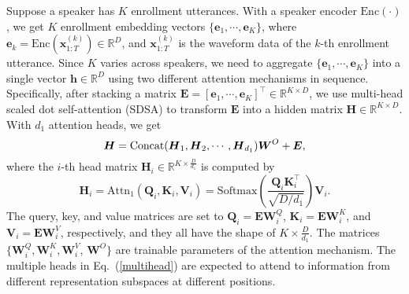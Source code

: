 \documentclass{article}
\begin{document}
Suppose a speaker has $K$ enrollment utterances. With a speaker encoder $\text{Enc}(\cdot)$,  we get $K$ enrollment embedding vectors $\{\boldsymbol{e}_1, \cdots, \boldsymbol{e}_K\}$, where $\boldsymbol{e}_k=\text{Enc}(\boldsymbol{x}_{1:T}^{(k)})\in\mathbb{R}^{D}$, and $\boldsymbol{x}_{1:T}^{(k)}$ is the waveform data of the $k$-th enrollment utterance.
Since $K$ varies across speakers, we need to aggregate $\{\boldsymbol{e}_1, \cdots, \boldsymbol{e}_K\}$ into a single vector $\boldsymbol{h}\in\mathbb{R}^{D}$ using two different attention mechanisms in sequence. Specifically, after stacking a matrix $\boldsymbol{E} = [\boldsymbol{e}_1, \cdots, \boldsymbol{e}_K]^\top\in\mathbb{R}^{K\times{D}}$, we use multi-head scaled dot self-attention (SDSA) \cite{Vaswani2017-Attention} to transform $\boldsymbol{E}$ into a hidden matrix $\boldsymbol{H}\in\mathbb{R}^{K\times{D}}$. With $d_1$ attention heads, we get
\begin{equation}
    \label{multihead}
    \boldsymbol{H} = {\rm{Concat}}(\boldsymbol{H}_1, \boldsymbol{H}_2, \cdots , \boldsymbol{H}_{d_1}) \boldsymbol{W}^O + \boldsymbol{E},
\end{equation}
where the $i$-th head matrix $\boldsymbol{H}_i\in\mathbb{R}^{K\times\frac{D}{d_1}}$ is computed by
\begin{equation}
    \label{attention_transform}
\boldsymbol{H}_i = \text{Attn}_1(\boldsymbol{Q}_i, \boldsymbol{K}_i, \boldsymbol{V}_i) = \text{Softmax}(\frac{\boldsymbol{Q}_i\boldsymbol{K}_i^\top}{\sqrt{{D}/{d_1}}})\boldsymbol{V}_i.
\end{equation}
The query, key, and value matrices are set to $\boldsymbol{Q}_i = \boldsymbol{E}\boldsymbol{W}_i^Q$, $\boldsymbol{K}_i = \boldsymbol{E}\boldsymbol{W}_i^K$, and $\boldsymbol{V}_i = \boldsymbol{E}\boldsymbol{W}_i^V$, respectively, and they all have the shape of  ${K\times\frac{D}{d_1}}$. The matrices $\{\boldsymbol{W}_i^Q, \boldsymbol{W}_i^K, \boldsymbol{W}_i^V$, $\boldsymbol{W}^O\}$ are trainable parameters of the attention mechanism. 
The multiple heads in Eq.\ (\ref{multihead}) are expected to attend to information from different representation subspaces at different positions.
\end{document}
